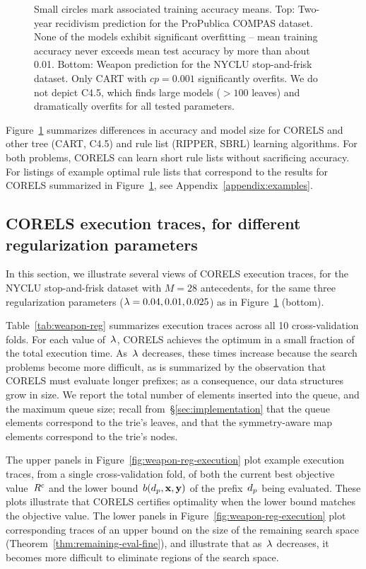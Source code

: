 \begin{figure}[t!]
{%
Small circles mark associated training accuracy means.
%
Top:  Two-year recidivism prediction for the ProPublica COMPAS dataset.
%
%
None of the models exhibit significant overfitting --
mean training accuracy never exceeds mean test accuracy
by more than about 0.01.
%
Bottom:  Weapon prediction for the NYCLU stop-and-frisk dataset.
%
%
Only CART with ${cp = 0.001}$ significantly overfits.
%
We do not depict C4.5, which finds large models (${>100}$ leaves)
and dramatically overfits for all tested parameters.
}
\label{fig:sparsity}
\end{figure}

Figure~\ref{fig:sparsity} summarizes differences in accuracy and model size
for CORELS and other tree (CART, C4.5) and rule list (RIPPER, SBRL) learning algorithms.
%
For both problems, CORELS can learn short rule lists without sacrificing accuracy.
%
For listings of example optimal rule lists that correspond to the results
for CORELS summarized in Figure~\ref{fig:sparsity}, see Appendix~\ref{appendix:examples}.

\subsection{CORELS execution traces, for different regularization parameters}
\label{sec:reg-param}

In this section, we illustrate several views of CORELS execution traces,
for the NYCLU stop-and-frisk dataset with ${M = 28}$ antecedents,
for the same three regularization parameters (${{\lambda} = 0.04, 0.01, 0.025}$)
as in Figure~\ref{fig:sparsity} (bottom).

Table~\ref{tab:weapon-reg} summarizes execution traces across all 10 cross-validation folds.
%
For each value of~${\lambda}$, CORELS achieves the optimum in a small fraction of the total execution time.
%
As~${\lambda}$ decreases, these times increase because the search problems become more difficult,
as is summarized by the observation that CORELS must evaluate longer prefixes;
as a consequence, our data structures grow in size.
%
We report the total number of elements inserted into the queue, and the maximum queue size;
recall from~\S\ref{sec:implementation} that the queue elements correspond to the trie's leaves,
and that the symmetry-aware map elements correspond to the trie's nodes.

The upper panels in Figure~\ref{fig:weapon-reg-execution} plot example execution traces,
from a single cross-validation fold, of both the current best objective value~${R^c}$
and the lower bound~$b(d_p, \mathbf{x}, \mathbf{y})$ of the prefix~$d_p$ being evaluated.
%
These plots illustrate that CORELS certifies optimality
when the lower bound matches the objective value.
%
The lower panels in Figure~\ref{fig:weapon-reg-execution} plot corresponding traces of
an upper bound on the size of the remaining search space (Theorem~\ref{thm:remaining-eval-fine}),
and illustrate that as~${\lambda}$ decreases, it becomes more difficult to eliminate regions of the search space.


